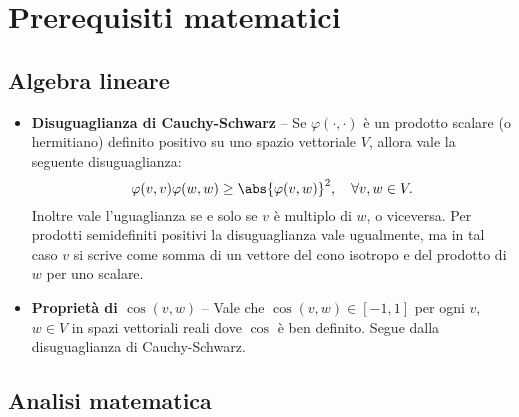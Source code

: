 \chapter*{Prerequisiti matematici}
\setlength{\parindent}{2pt}

\begin{multicols*}{2}

\section*{Algebra lineare}

\begin{itemize}
    \item \textbf{Disuguaglianza di Cauchy-Schwarz} -- Se $\varphi(\cdot, \cdot)$
    è un prodotto scalare (o hermitiano) definito positivo su uno spazio vettoriale $V$, allora vale la seguente disuguaglianza:
    \[
        \varphi(v, v) \varphi(w, w) \geq \abs{\varphi(v, w)}^2 , \quad \forall v, w \in V.
    \]
    Inoltre vale l'uguaglianza se e solo se $v$ è multiplo di $w$, o viceversa. Per
    prodotti semidefiniti positivi la disuguaglianza vale ugualmente, ma in
    tal caso $v$ si scrive come somma di un vettore del cono isotropo e del prodotto di $w$ per uno scalare. 
    \item \textbf{Proprietà di $\cos(v, w)$} -- Vale che $\cos(v, w) \in [-1, 1]$ per
    ogni $v$, $w \in V$ in spazi vettoriali reali dove $\cos$ è ben definito. Segue
    dalla disuguaglianza di Cauchy-Schwarz.
\end{itemize}

\section*{Analisi matematica}


\end{multicols*}
